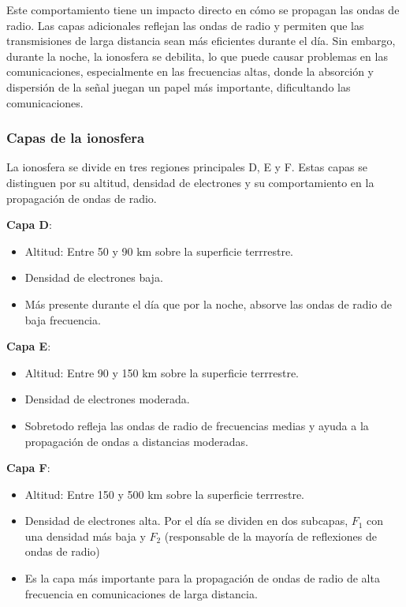 Este comportamiento tiene un impacto directo en cómo se propagan las ondas de radio. Las capas adicionales reflejan las ondas de radio y permiten que las transmisiones de larga distancia sean más eficientes durante el día.  Sin embargo, durante la noche, la ionosfera se debilita, lo que puede causar problemas en las comunicaciones, especialmente en las frecuencias altas, donde la absorción y dispersión de la señal juegan un papel más importante, dificultando las comunicaciones. \\

\subsubsection{Capas de la ionosfera}

La ionosfera se divide en tres regiones principales  D, E y F. Estas capas se distinguen por su altitud, densidad de electrones y su comportamiento en la propagación de ondas de radio.\\

\begin{nosangria}
\textbf{Capa D}:
\end{nosangria}
\begin{itemize}
\item Altitud: Entre 50 y 90 km sobre la superficie terrrestre.
\item Densidad de electrones baja.
\item Más presente durante el día que por la noche, absorve las ondas de radio de baja frecuencia.\\
\end{itemize}

\begin{nosangria}
\textbf{Capa E}:
\end{nosangria}
\begin{itemize}
\item Altitud: Entre 90 y 150 km sobre la superficie terrrestre.
\item Densidad de electrones moderada.
\item Sobretodo refleja las ondas de radio de frecuencias medias y ayuda a la propagación de ondas a distancias moderadas.\\
\end{itemize}

\begin{nosangria}
\textbf{Capa F}:
\end{nosangria}
\begin{itemize}
\item Altitud: Entre 150 y 500 km sobre la superficie terrrestre.
\item Densidad de electrones alta. Por el día se dividen en dos subcapas, \(F_1\) con una densidad más baja y \(F_2\) (responsable de la mayoría de reflexiones de ondas de radio)
\item Es la capa más importante para la propagación de ondas de radio de alta frecuencia en comunicaciones de larga distancia.\\
\end{itemize}

